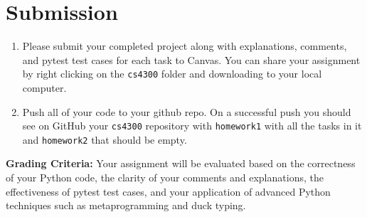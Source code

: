 \documentclass{article}
\begin{document}
\section{Submission}

\begin{enumerate}
    \item Please submit your completed project along with explanations, comments, and pytest test cases for each task to Canvas. You can share your assignment by right clicking on the \verb|cs4300| folder and downloading to your local computer.
    \item Push all of your code to your github repo. On a successful push you should see on GitHub your \verb|cs4300| repository with \verb|homework1| with all the tasks in it and \verb|homework2| that should be empty. 
\end{enumerate}

\textbf{Grading Criteria:} Your assignment will be evaluated based on the correctness of your Python code, the clarity of your comments and explanations, the effectiveness of pytest test cases, and your application of advanced Python techniques such as metaprogramming and duck typing.
\end{document}

